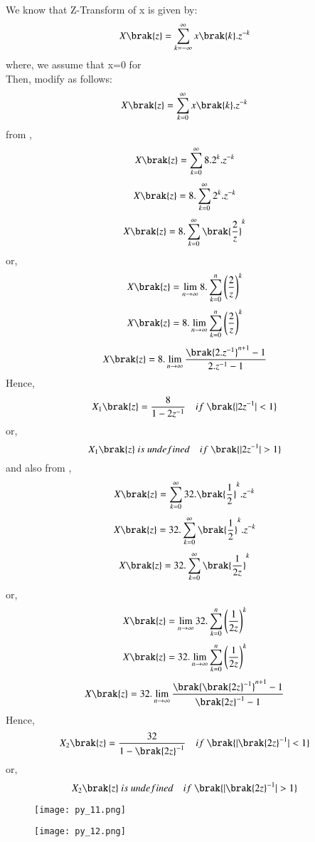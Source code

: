 \documentclass[beamer]{IEEEtran}
\theoremstyle{remark}
\begin{document}
We know that Z-Transform of x is given by:
\begin{align}
\label{a13}
    X\brak{z}=\sum_{k=-\infty}^{\infty} x\brak{k}.z^{-k}
\end{align}
where, we assume that x=0   for \\
\brak{\ref{a13}} Then, modify as follows:
\begin{align}
\label{a14}
    X\brak{z}=\sum_{k=0}^{\infty} x\brak{k}.z^{-k}
\end{align}
from \brak{\ref{a11}},
$$X\brak{z}=\sum_{k=0}^{\infty} 8.2^k.z^{-k}$$
$$X\brak{z}=8.\sum_{k=0}^{\infty} 2^k.z^{-k}$$
$$X\brak{z}=8.\sum_{k=0}^{\infty} \brak{\frac{2}{z}}^k$$
or,
$$X\brak{z}=\lim_{n\to\infty}8.\sum_{k=0}^{n} \left(\frac{2}{z}\right)^k$$
$$X\brak{z}=8.\lim_{n\to\infty}\sum_{k=0}^{n}
\left(\frac{2}{z}\right)^k$$
$$X\brak{z}=8.\lim_{n\to\infty} \frac{\brak{2.z^{-1}}^{n+1}-1}{2.z^{-1}-1}$$
Hence,
$$X_1\brak{z}=\frac{8}{1-2z^{-1}}\quad if\ \brak{|2z^{-1}|<1}$$
or,
$$X_1\brak{z}\ is\ undefined\quad if\ \brak{|2z^{-1}|>1}$$
and also from \brak{\ref{a12}},
$$X\brak{z}=\sum_{k=0}^{\infty} 32.\brak{\frac{1}{2}}^k.z^{-k}$$
$$X\brak{z}=32.\sum_{k=0}^{\infty} \brak{\frac{1}{2}}^k.z^{-k}$$
$$X\brak{z}=32.\sum_{k=0}^{\infty} \brak{\frac{1}{2z}}^k$$
or,
$$X\brak{z}=\lim_{n\to\infty}32.\sum_{k=0}^{n} \left(\frac{1}{2z}\right)^k$$
$$X\brak{z}=32.\lim_{n\to\infty}\sum_{k=0}^{n}
\left(\frac{1}{2z}\right)^k$$
$$X\brak{z}=32.\lim_{n\to\infty} \frac{\brak{\brak{2z}^{-1}}^{n+1}-1}{{\brak{2z}^{-1}}-1}$$
Hence,
$$X_2\brak{z}=\frac{32}{1-{\brak{2z}^{-1}}}\quad if\ \brak{|{\brak{2z}^{-1}}|<1}$$
or,
$$X_2\brak{z}\ is\ undefined\quad if\ \brak{|{\brak{2z}^{-1}}|>1}$$
\begin{figure}[h]
    \centering
    \texttt{[image: py\_11.png]}
    \label{fig:enter-label}
\end{figure}
\begin{figure}[h]
    \centering
    \texttt{[image: py\_12.png]}
    \label{fig:enter-label}
\end{figure}
\end{document}
